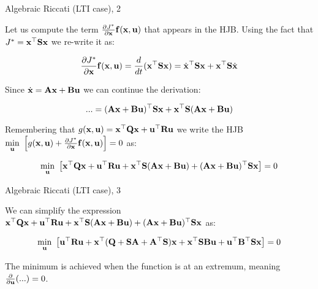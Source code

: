 \documentclass{beamer}
\begin{document}
\begin{frame}{Algebraic Riccati (LTI case), 2}
\begin{flushleft}

Let us compute the term $\frac{\partial J^*}{\partial \mathbf{x}} \mathbf{f} (\mathbf{x}, \mathbf{u}) $ that appears in the HJB. Using the fact that $J^* =\mathbf{x}^\top \mathbf{S} \mathbf{x}$ we re-write it as:

\begin{equation}
	\frac{\partial J^*}{\partial \mathbf{x}} \mathbf{f} (\mathbf{x}, \mathbf{u}) = \frac{d}{dt}(\mathbf{x}^\top \mathbf{S}\mathbf{x})
	=
	\dot{\mathbf{x}}^\top \mathbf{S}\mathbf{x} + \mathbf{x}^\top \mathbf{S}\dot{\mathbf{x}} 
\end{equation}

Since $\dot {\mathbf{x}} = \mathbf{A}  \mathbf{x} + \mathbf{B} \mathbf{u}$ we can continue the derivation:

\begin{equation}
	... =
	(\mathbf{A}  \mathbf{x} + \mathbf{B} \mathbf{u})^\top \mathbf{S}\mathbf{x} + \mathbf{x}^\top \mathbf{S}(\mathbf{A}  \mathbf{x} + \mathbf{B} \mathbf{u})
\end{equation}


\bigskip

Remembering that $g(\mathbf{x}, \mathbf{u} ) = 
\mathbf{x}^\top \mathbf{Q} \mathbf{x} +
\mathbf{u} ^\top \mathbf{R} \mathbf{u}$ we write the HJB $\underset{\bo{u}}{\min} \ 
\left[ 
g(\bo{x}, \bo{u}) + 
\frac{\partial J^*}{\partial \bo{x}} \bo{f} (\bo{x}, \bo{u}) 
\right] = 0$ as:

\[
\underset{\bo{u}}{\min} \ 
\left [ 
\mathbf  x^\top \bo{Q} \bo{x} +
\mathbf  u^\top \bo{R} \bo{u}
+ 
\bo{x}^\top \bo{S}
(\bo{A} \bo{x} + \bo{B} \bo{u}) 
+ 
(\bo{A} \bo{x} + \bo{B} \bo{u})^\top
\bo{S} \bo{x}
\right ] = 0
\]

\end{flushleft}
\end{frame}






\begin{frame}{Algebraic Riccati (LTI case), 3}
	\begin{flushleft}
		
		We can simplify the expression $\mathbf  x^\top \mathbf{Q} \mathbf{x} +
		\mathbf{u}^\top \mathbf{R} \mathbf{u}
		+ 
		\mathbf{x}^\top \mathbf{S}
		(\mathbf{A} \mathbf{x} + \mathbf{B} \mathbf{u}) 
		+ 
		(\mathbf{A} \mathbf{x} + \mathbf{B} \mathbf{u})^\top
		\mathbf{S} \mathbf{x}$ as:


		\[
		\underset{\bo{u}}{\min} \ 
		\left [ 
		\bo{u}^\top \bo{R} \bo{u}
		+ 
		\bo{x}^\top (
		\bo{Q} + \bo{S} \bo{A} + \bo{A}^\top \bo{S}
		)\bo{x}
		+ 
		\bo{x}^\top \bo{S} \bo{B} \bo{u} 
		+ \bo{u}^\top \bo{B}^\top \bo{S} \bo{x} 
		\right ] = 0
		\]
		
		
		\bigskip
		
		The minimum is achieved when the function is at an extremum, meaning $\frac{\partial}{\partial \mathbf{u}} (...) = 0$.
		
	\end{flushleft}
\end{frame}
\end{document}
